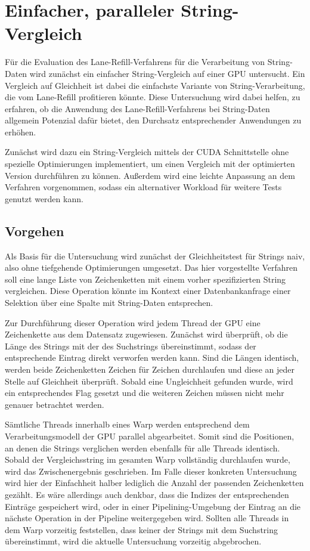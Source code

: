 \chapter{Einfacher, paralleler String-Vergleich}

Für die Evaluation des Lane-Refill-Verfahrens für die Verarbeitung von String-Daten wird zunächst ein einfacher String-Vergleich auf einer GPU untersucht.
Ein Vergleich auf Gleichheit ist dabei die einfachste Variante von String-Verarbeitung, die vom Lane-Refill profitieren könnte.
Diese Untersuchung wird dabei helfen, zu erfahren, ob die Anwendung des Lane-Refill-Verfahrens bei String-Daten allgemein Potenzial dafür bietet, den Durchsatz entsprechender Anwendungen zu erhöhen.

Zunächst wird dazu ein String-Vergleich mittels der CUDA Schnittstelle ohne spezielle Optimierungen implementiert, um einen Vergleich mit der optimierten Version durchführen zu können.
Außerdem wird eine leichte Anpassung an dem Verfahren vorgenommen, sodass ein alternativer Workload für weitere Tests genutzt werden kann.

\section{Vorgehen}

Als Basis für die Untersuchung wird zunächst der Gleichheitstest für Strings naiv, also ohne tiefgehende Optimierungen umgesetzt.
Das hier vorgestellte Verfahren soll eine lange Liste von Zeichenketten mit einem vorher spezifizierten String vergleichen.
Diese Operation könnte im Kontext einer Datenbankanfrage einer Selektion über eine Spalte mit String-Daten entsprechen.

Zur Durchführung dieser Operation wird jedem Thread der GPU eine Zeichenkette aus dem Datensatz zugewiesen.
Zunächst wird überprüft, ob die Länge des Strings mit der des Suchstrings übereinstimmt, sodass der entsprechende Eintrag direkt verworfen werden kann.
Sind die Längen identisch, werden beide Zeichenketten Zeichen für Zeichen durchlaufen und diese an jeder Stelle auf Gleichheit überprüft.
Sobald eine Ungleichheit gefunden wurde, wird ein entsprechendes Flag gesetzt und die weiteren Zeichen müssen nicht mehr genauer betrachtet werden.

Sämtliche Threads innerhalb eines Warp werden entsprechend dem Verarbeitungsmodell der GPU parallel abgearbeitet.
Somit sind die Positionen, an denen die Strings verglichen werden ebenfalls für alle Threads identisch.
Sobald der Vergleichsstring im gesamten Warp vollständig durchlaufen wurde, wird das Zwischenergebnis geschrieben.
Im Falle dieser konkreten Untersuchung wird hier der Einfachheit halber lediglich die Anzahl der passenden Zeichenketten gezählt.
Es wäre allerdings auch denkbar, dass die Indizes der entsprechenden Einträge gespeichert wird, oder in einer Pipelining-Umgebung der Eintrag an die nächste Operation in der Pipeline weitergegeben wird.
Sollten alle Threads in dem Warp vorzeitig feststellen, dass keiner der Strings mit dem Suchstring übereinstimmt, wird die aktuelle Untersuchung vorzeitig abgebrochen.

